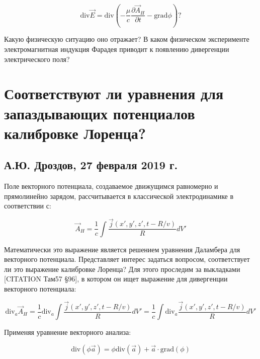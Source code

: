 \documentclass[12pt, a4paper]{article}
\begin{document}
\begin{equation}
\text{div} \vec{E} = \text{div} \left( -\frac{\mu}{c} \frac{\partial \vec{A}_H}{\partial t} - \text{grad} \phi \right)?
\label{eq:div_E_question}
\end{equation}

Какую физическую ситуацию оно отражает? В каком физическом эксперименте электромагнитная индукция Фарадея приводит к появлению дивергенции электрического поля?

\section{Соответствуют ли уравнения для запаздывающих потенциалов калибровке Лоренца?}
\label{sec:work03}

\subsection*{А.Ю. Дроздов, 27 февраля 2019 г.}

Поле векторного потенциала, создаваемое движущимся равномерно и прямолинейно зарядом, рассчитывается в классической электродинамике в соответствии с:

\begin{equation}
\vec{A}_H = \frac{1}{c} \int \frac{\vec{j}(x', y', z', t - R/v)}{R} dV'
\label{eq:retarded_A}
\end{equation}

Математически это выражение является решением уравнения Даламбера для векторного потенциала. Представляет интерес задаться вопросом, соответствует ли это выражение калибровке Лоренца? Для этого проследим за выкладками [CITATION Там57 §96], в котором он ищет выражение для дивергенции векторного потенциала:

\begin{equation}
\text{div}_a \vec{A}_H = \frac{1}{c} \text{div}_a \int \frac{\vec{j}(x', y', z', t - R/v)}{R} dV' = \frac{1}{c} \int \text{div}_a \frac{\vec{j}(x', y', z', t - R/v)}{R} dV'
\label{eq:div_retarded_A}
\end{equation}

Применяя уравнение векторного анализа:

\begin{equation}
\text{div}(\phi \vec{a}) = \phi \text{div}(\vec{a}) + \vec{a} \cdot \text{grad}(\phi)
\label{eq:div_identity_again}
\end{equation}
\end{document}
